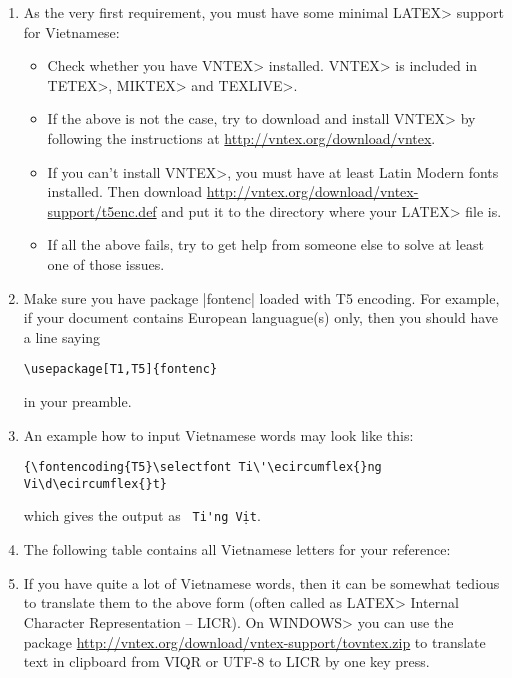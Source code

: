 \documentclass[a4paper,12pt]{article}
\begin{document}
\begin{enumerate}
\item As the very first requirement, you must have some minimal \<LATEX>
support for Vietnamese:
\begin{itemize}
\item Check whether you have \<VNTEX> installed. \<VNTEX> is included
in \<TETEX>, \<MIKTEX> and \<TEXLIVE>. 

\item If the above is not the case, try to download and install \<VNTEX> by
following the instructions at \url{http://vntex.org/download/vntex}.

\item If you can't install \<VNTEX>, you must have at least Latin Modern
fonts installed. Then download
\url{http://vntex.org/download/vntex-support/t5enc.def} and put it to the
directory where your \<LATEX> file is.

\item If all the above fails, try to get help from someone else to solve
at least one of those issues.
\end{itemize}

\item  Make sure you have package |fontenc| loaded with T5 encoding. For
example, if your document contains European languague(s) only, then you
should have a line saying

\begin{verbatim}
\usepackage[T1,T5]{fontenc}
\end{verbatim}

in your preamble.

\item An example how to input Vietnamese words may look like this:

\begin{verbatim}
{\fontencoding{T5}\selectfont Ti\'\ecircumflex{}ng Vi\d\ecircumflex{}t}
\end{verbatim}

which gives the output as \texttt{\selectfont
Ti\'\ecircumflex{}ng Vi\d\ecircumflex{}t}.

\item The following table contains all Vietnamese letters for your
reference:

{\selectfont

}

\item If you have quite a lot of Vietnamese words, then it can be somewhat
tedious to translate them to the above form (often called as \<LATEX>
Internal Character Representation -- LICR). On \<WINDOWS> you can use the
package \url{http://vntex.org/download/vntex-support/tovntex.zip}
to translate text in clipboard from VIQR or UTF-8 to LICR by one key press.


\end{enumerate}
\end{document}
